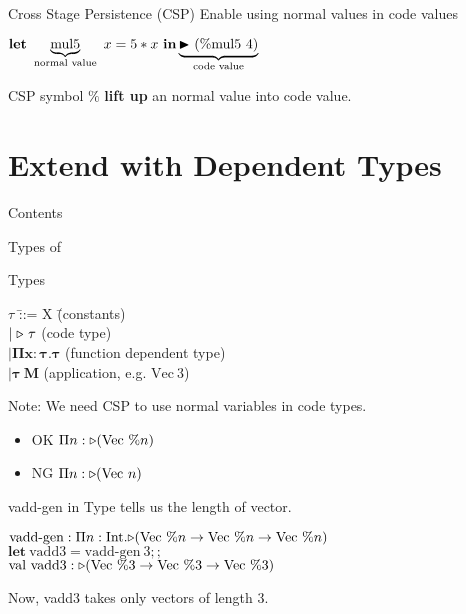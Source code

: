 \documentclass[dvipdfmx,aspectratio=169, 20pt]{beamer}
\begin{document}
\begin{frame}[fragile]{Cross Stage Persistence (CSP)}
    Enable using normal values in code values
    \begin{center}
        \( \textbf{let}\ \underbrace{\text{mul5}}_{\text{normal value}}\ x = 5 * x\ \textbf{in} \underbrace{{\mathop{\blacktriangleright}}\ (\% \text{mul5}\ 4)}_{\text{code value}} \)
    \end{center}
    CSP symbol \( \% \) {\bf{lift up}} an normal value into code value.
\end{frame}

\section{Extend \LTP with Dependent Types}

\begin{frame}{Contents}
    \tableofcontents[currentsection]
  \note{
  }
\end{frame}

\begin{frame}[fragile]{Types of \LMD}
    \begin{block}{Types}
    \begin{tabbing}
        \hspace{5mm} \( \tau \) \= ::= X \hspace{20mm} \= (constants) \\
        \> \( \mid {\mathop{\triangleright}}\ \tau \) \> (code type) \\
        \> \( \bm{\mid \Pi x:\tau.\tau} \) \> (function dependent type) \\
        \> \( \bm{\mid \tau\ M} \) \> (application, e.g. \(\text{Vec}\ 3\))
    \end{tabbing}
    \end{block}
    Note: We need CSP to use normal variables in code types.
    \begin{itemize}
        \item OK  \( \Pi n: {\mathop{\triangleright}} (\text{Vec}\ \%n) \)
        \item NG  \( \Pi n: {\mathop{\triangleright}} (\text{Vec}\ n) \)
    \end{itemize}
   \note{
    }
\end{frame}

\begin{frame}[fragile]{vadd-gen in \LMD}
    Type tells us the length of vector.
    \newcommand{\Vn}{\text{Vec}\ \%n}
    \newcommand{\Vt}{\text{Vec}\ \%3}
    \begin{tabbing}
        \hspace{5mm} \= \( \text{vadd-gen} : \Pi n:\I. \TW (\Vn \to \Vn \to \Vn) \) \\[2mm]
        \> \( \textbf{let}\ \text{vadd3} = \text{vadd-gen}\ 3;; \) \\
        \> \( \text{val}\ \text{vadd3} : \TW (\Vt \to \Vt \to \Vt) \) \\[2mm]
    \end{tabbing}
    Now, vadd3 takes only vectors of length 3.
\end{frame}
\end{document}
